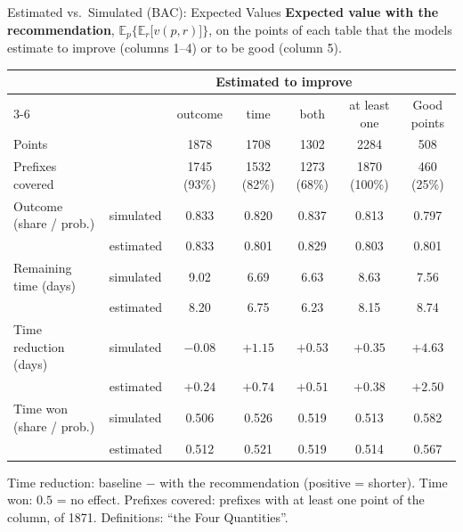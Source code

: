 \documentclass[aspectratio=169]{beamer} %
\begin{document}
\begin{frame}{Estimated vs.\ Simulated (BAC): Expected Values}
  \scriptsize\setlength{\aboverulesep}{0pt}\setlength{\belowrulesep}{1pt}
  \textbf{Expected value with the recommendation}, $\mathbb{E}_p\big\{\mathbb{E}_r\big[v(p,r)\big]\big\}$,
  on the points of each table that the models estimate to improve (columns 1--4) or to be good (column 5).
  \begin{center}\setlength{\tabcolsep}{3pt}
  \begin{tabular}{ll ccccc}
    \toprule
     & & \multicolumn{4}{c}{Estimated to improve} & \\
    \cmidrule(lr){3-6}
     & & outcome & time & both & at least one & Good points \\
    \midrule
    Points & & 1878 & 1708 & 1302 & 2284 & 508 \\
    Prefixes covered & & 1745 (93\%) & 1532 (82\%) & 1273 (68\%) & 1870 (100\%) & 460 (25\%) \\
    \midrule
    Outcome (share / prob.) & simulated & 0.833 & 0.820 & 0.837 & 0.813 & 0.797 \\
     & estimated & 0.833 & 0.801 & 0.829 & 0.803 & 0.801 \\
    \addlinespace[2pt]
    Remaining time (days) & simulated & 9.02 & 6.69 & 6.63 & 8.63 & 7.56 \\
     & estimated & 8.20 & 6.75 & 6.23 & 8.15 & 8.74 \\
    \addlinespace[2pt]
    Time reduction (days) & simulated & $-0.08$ & $+1.15$ & $+0.53$ & $+0.35$ & $+4.63$ \\
     & estimated & $+0.24$ & $+0.74$ & $+0.51$ & $+0.38$ & $+2.50$ \\
    \addlinespace[2pt]
    Time won (share / prob.) & simulated & 0.506 & 0.526 & 0.519 & 0.513 & 0.582 \\
     & estimated & 0.512 & 0.521 & 0.519 & 0.514 & 0.567 \\
    \bottomrule
  \end{tabular}
  \end{center}
  {\tiny Time reduction: baseline $-$ with the recommendation (positive = shorter). Time won: $0.5$ = no effect.
  Prefixes covered: prefixes with at least one point of the column, of 1871. Definitions: ``the Four Quantities''.}
\end{frame}
\end{document}
